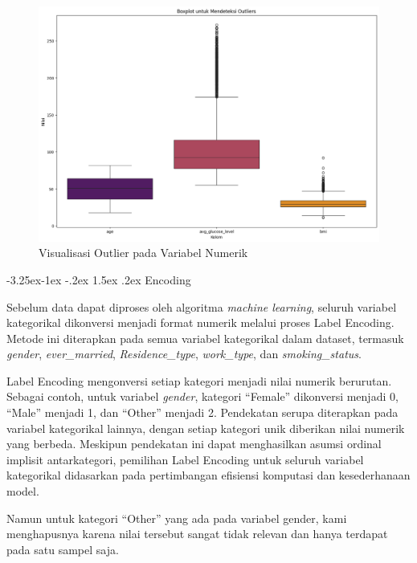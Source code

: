 \documentclass[10pt]{article}
\makeatletter
\renewcommand\subsubsection{\@startsection{subsubsection}{3}{\z@}%
  {-3.25ex\@plus -1ex \@minus -.2ex}%
  {1.5ex \@plus .2ex}%
  {\normalfont\itshape\normalsize}}
\makeatother
\begin{document}
\begin{multicols}{2}
    \begin{figure}[H]
        \includegraphics[width=\columnwidth]{./assets/outliers.png}
        \caption{Visualisasi Outlier pada Variabel Numerik}%
        \label{fig:outliers-boxplot}
    \end{figure}

    \subsubsection{Encoding}

    Sebelum data dapat diproses oleh algoritma \textit{machine learning}, seluruh
    variabel kategorikal dikonversi menjadi format numerik melalui proses Label
    Encoding. Metode ini diterapkan pada semua variabel kategorikal dalam dataset,
    termasuk \textit{gender}, \textit{ever\_married}, \textit{Residence\_type},
    \textit{work\_type}, dan \textit{smoking\_status}.

    Label Encoding mengonversi setiap kategori menjadi nilai numerik berurutan.
    Sebagai contoh, untuk variabel \textit{gender}, kategori ``Female'' dikonversi
    menjadi 0, ``Male'' menjadi 1, dan ``Other'' menjadi 2. Pendekatan serupa
    diterapkan pada variabel kategorikal lainnya, dengan setiap kategori unik
    diberikan nilai numerik yang berbeda. Meskipun pendekatan ini dapat
    menghasilkan asumsi ordinal implisit antarkategori, pemilihan Label Encoding
    untuk seluruh variabel kategorikal didasarkan pada pertimbangan efisiensi
    komputasi dan kesederhanaan model.

    Namun untuk kategori ``Other'' yang ada pada variabel gender, kami menghapusnya
    karena nilai tersebut sangat tidak relevan dan hanya terdapat pada satu sampel
    saja.


\end{multicols}
\end{document}
